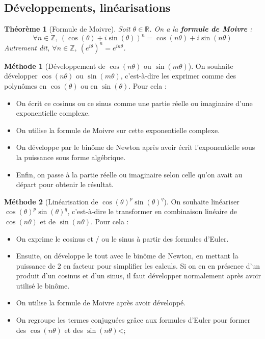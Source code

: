\documentclass[french]{book}
\newcommand{\Z}{\mathbb{Z}}
\newcommand{\R}{\mathbb{R}}
\theoremstyle{plain}
\newtheorem{thm}{Théorème}[chapter]
\theoremstyle{definition}
\newtheorem{met}{Méthode}[chapter]
\theoremstyle{remark}
\begin{document}
\subsection{Développements, linéarisations}
\begin{thm}[Formule de Moivre]
	Soit $\theta\in\R$. On a la \textbf{formule de Moivre} :$$\forall n\in\Z,\ (\cos(\theta)+i\sin(\theta))^n=\cos(n\theta)+i\sin(n\theta)$$ Autrement dit, $\forall n\in\Z,\ (e^{i\theta})^n=e^{in\theta}$.
\end{thm}
\begin{met}[Développement de $\cos(n\theta)$ ou $\sin(m\theta)$]
	On souhaite développer $\cos(n\theta)$ ou $\sin(m\theta)$, c'est-à-dire les exprimer comme des polynômes en $\cos(\theta)$ ou en $\sin(\theta)$. Pour cela : \begin{itemize}
		\item On écrit ce cosinus ou ce sinus comme une partie réelle ou imaginaire d'une exponentielle complexe.
		\item On utilise la formule de Moivre sur cette exponentielle complexe.
		\item On développe par le binôme de Newton après avoir écrit l'exponentielle sous la puissance sous forme algébrique.
		\item Enfin, on passe à la partie réelle ou imaginaire selon celle qu'on avait au départ pour obtenir le résultat.
	\end{itemize}
\end{met}
\begin{met}[Linéarisation de $\cos(\theta)^p\sin(\theta)^q$]
	On souhaite linéariser $\cos(\theta)^p\sin(\theta)^q$, c'est-à-dire le transformer en combinaison linéaire de $\cos(n\theta)$ et de $\sin(n\theta)$. Pour cela : 
	\begin{itemize}
		\item On exprime le cosinus et / ou le sinus à partir des formules d'Euler.
		\item Ensuite, on développe le tout avec le binôme de Newton, en mettant la puissance de $2$ en facteur pour simplifier les calculs. Si on en en présence d'un produit d'un cosinus et d'un sinus, il faut développer normalement après avoir utilisé le binôme.
		\item On utilise la formule de Moivre après avoir développé.
		\item On regroupe les termes conjuguées grâce aux formules d'Euler pour former des $\cos(n\theta)$ et des $\sin(n\theta)$<;
	\end{itemize}
\end{met}
\end{document}

